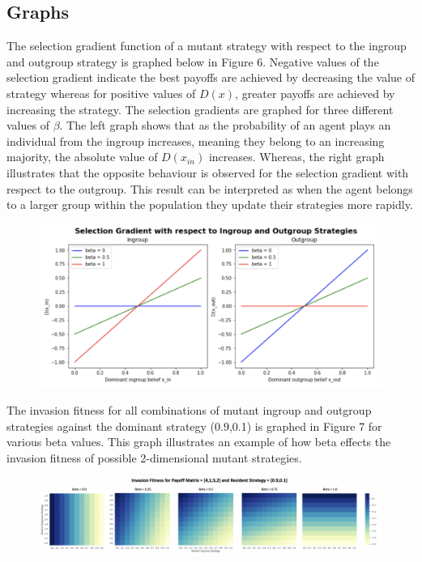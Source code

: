\documentclass[]{llncs}
\begin{document}
\subsection{Graphs}
The selection gradient function of a mutant strategy with respect to the ingroup and outgroup strategy is graphed below in Figure 6. Negative values of the selection gradient indicate the best payoffs are achieved by decreasing the value of strategy whereas for positive values of $D(x)$, greater payoffs are achieved by increasing the strategy. The selection gradients are graphed for three different values of $\beta$. The left graph shows that as the probability of an agent plays an individual from the ingroup increases, meaning they belong to an increasing majority, the absolute value of $D(x_{in})$ increases. Whereas, the right graph illustrates that the opposite behaviour is observed for the selection gradient with respect to the outgroup. This result can be interpreted as when the agent belongs to a larger group within the population they update their strategies more rapidly. \\

\begin{figure}
\centering
\includegraphics[width=12cm]{images/beta_sg}
\caption{ }
\end{figure}

The invasion fitness for all combinations of mutant ingroup and outgroup strategies against the dominant strategy (0.9,0.1) is graphed in Figure 7 for various beta values. This graph illustrates an example of how beta effects the invasion fitness of possible 2-dimensional mutant strategies.

\begin{figure}
\centering
\includegraphics[width=15cm]{images/inv_fit_beta}
\caption{ }
\end{figure}
\end{document}
